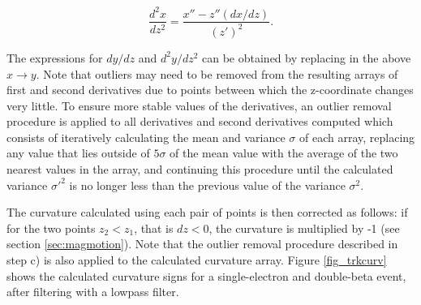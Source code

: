 \documentclass{JINST}
\begin{document}
\begin{equation}
\frac{d^2x}{dz^2} = \frac{x'' - z''(dx/dz)}{(z')^2}.
\end{equation}

The expressions for $dy/dz$ and $d^2y/dz^2$ can be obtained by replacing in the above $x \rightarrow y$.  Note that outliers may need to be removed from the resulting arrays of first and second derivatives due to points between which the z-coordinate changes very little.  To ensure more stable values of the derivatives, an outlier removal procedure is applied to all derivatives and second derivatives computed which consists of iteratively calculating the mean and variance $\sigma$ of each array, replacing any value that lies outside of $5\sigma$ of the mean value with the average of the two nearest values in the array, and continuing this procedure until the calculated variance $\sigma'^2$ is no longer less than the previous value of the variance $\sigma^2$. %

The curvature calculated using each pair of points is then corrected as follows: if for the two points $z_2 < z_1$, that is $dz < 0$, the curvature is multiplied by -1 (see section \ref{sec:magmotion}).  Note that the outlier removal procedure described in step c) is also applied to the calculated curvature array.  Figure \ref{fig_trkcurv} shows the calculated curvature signs for a single-electron and double-beta event, after filtering with a lowpass filter.
\end{document}
